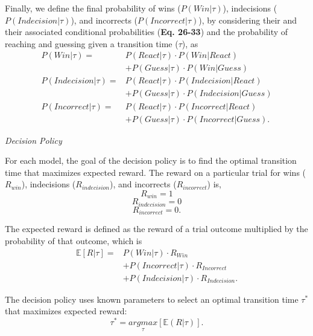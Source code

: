 \documentclass[12pt]{article}
\newcommand\boldblue[1]{\textcolor{mydarkblue}{\textbf{#1}}}
\begin{document}
Finally, we define the final probability of wins ($P(Win|\tau)$), indecisions ($P(Indecision|\tau)$), and incorrects ($P(Incorrect|\tau)$), by considering their and their associated conditional probabilities (\boldblue{Eq. 26-33}) and the probability of reaching and guessing given a transition time ($\tau$), as
\begin{align}
    P(Win|\tau)        = & P(React|\tau) \cdot P(Win|React) \nonumber        \\ &+  P(Guess|\tau) \cdot P(Win|Guess)\\
    P(Indecision|\tau) = & P(React|\tau) \cdot P(Indecision|React) \nonumber \\ &+ P(Guess|\tau) \cdot P(Indecision|Guess) \\
    P(Incorrect|\tau)  = & P(React|\tau) \cdot P(Incorrect|React) \nonumber  \\ &+ P(Guess|\tau) \cdot P(Incorrect|Guess).
\end{align}

\vspace{2mm}
\noindent\emph{Decision Policy}

\noindent For each model, the goal of the decision policy is to find the optimal transition time that maximizes expected reward. The reward on a particular trial for wins ($R_{win}$), indecisions ($R_{indecision}$), and incorrects ($R_{incorrect}$) is,
\begin{equation}
    R_{win} = 1
\end{equation}
\begin{equation}
    R_{indecision} = 0
\end{equation}
\begin{equation}
    R_{incorrect} = 0.
\end{equation}

The expected reward is defined as the reward of a trial outcome multiplied by the probability of that outcome, which is
%
\begin{align}
    \mathbb{E}[R|\tau] = & P(Win|\tau) \cdot R_{Win} \nonumber \\ &+ P(Incorrect|\tau) \cdot R_{Incorrect} \nonumber \\ &+ P(Indecision|\tau) \cdot R_{Indecision}.
\end{align}

The decision policy uses known parameters to select an optimal transition time $\tau^*$ that maximizes expected reward:
\begin{equation}
    \tau^* = \underset{\tau}{argmax}[\mathbb{E}(R|\tau)].
\end{equation}
\end{document}
